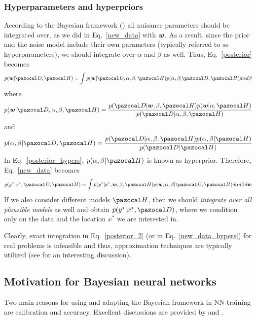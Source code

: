 \subsubsection{Hyperparameters and hyperpriors}\label{sec:hyperpriors}

According to the Bayesian framework (\cite{box1973bayesian}) all nuisance parameters should be integrated over, as we did in Eq.~\eqref{new_data} with $\boldsymbol{w}$. 
As a result, since the prior and the noise model include their own parameters (typically referred to as hyperparameters), we should integrate over $\alpha$ and $\beta$ as well.
Thus, Eq.~\eqref{posterior} becomes
\begin{equation}\label{posterior_2}
p(\bw|\cD,\cH) = \int p(\bw|\cD,\alpha,\beta,\cH) p(\alpha,\beta|\cD,\cH) d\alpha d\beta
\end{equation}
where
\begin{equation}\label{posterior_params}
p(\bw|\cD,\alpha,\beta,\cH) =\frac{p(\cD|\bw,\beta,\cH)p(\bw|\alpha,\cH)}{p(\cD|\alpha,\beta,\cH)}
\end{equation}
and 
\begin{equation}\label{posterior_hypers}
p(\alpha,\beta|\cD,\cH) =\frac{p(\cD|\alpha,\beta,\cH)p(\alpha,\beta|\cH)}{p(\cD|\cH)}
\end{equation}
In Eq.~\eqref{posterior_hypers}, $p(\alpha,\beta|\cH)$ is known as hyperprior.
Therefore, Eq.~\eqref{new_data} becomes
\begin{equation}\label{new_data_hypers}
p(y^*|x^*, \cD, \cH) = \int p(y^*|x^*, \bw,\beta, \cH)p(\bw,\alpha,\beta|\cD,\cH) d\alpha d\beta d\bw
\end{equation}
If we also consider different models $\cH$, then we should \textit{integrate over all plausible models} as well and obtain $p(y^*|x^*, \cD)$, where we condition only on the data and the location $x^*$ we are interested in.

Clearly, exact integration in Eq.~\eqref{posterior_2} (or in Eq.~\eqref{new_data_hypers}) for real problems is infeasible and thus, approximation techniques are typically utilized (see \cite{mackay1994hyperparameters} for an interesting discussion).  

\subsection{Motivation for Bayesian neural networks}

Two main reasons for using and adapting the Bayesian framework in NN training are calibration and accuracy. 
Excellent discussions are provided by \textcite{gal2016uncertainty} and \textcite{wilson2020bayesian}. 

